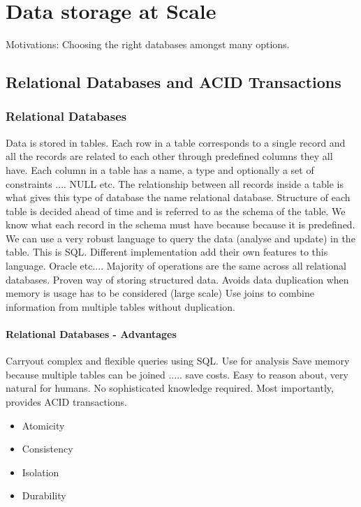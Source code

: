 \chapter{Data storage at Scale}
Motivations: Choosing the right databases amongst many options.


\section{Relational Databases and ACID Transactions}

\subsection{Relational Databases}
Data is stored in tables.
Each row in a table corresponds to a single record and all the records are related to each other through predefined columns they all have.
Each column in a table has a name, a type and optionally a set of constraints .... NULL etc.
The relationship between all records inside a table is what gives this type of database the name relational database.
Structure of each table is decided ahead of time and is referred to as the schema of the table.
We know what each record in the schema must have because because it is predefined.
We can use a very robust language to query the data (analyse and update) in the table.
This is SQL.
Different implementation add their own features to this language.
Oracle etc....
Majority of operations are the same across all relational databases.
Proven way of storing structured data.
Avoids data duplication when memory is usage has to be considered (large scale)
Use joins to combine information from multiple tables without duplication.

\subsubsection{Relational Databases - Advantages}
Carryout complex and flexible queries using SQL. Use for analysis
Save memory because multiple tables can be joined ..... save costs.
Easy to reason about, very natural for humans.
No sophisticated knowledge required.
Most importantly, provides ACID transactions.

\begin{itemize}
    \item Atomicity
    \item Consistency
    \item Isolation
    \item Durability
\end{itemize}

